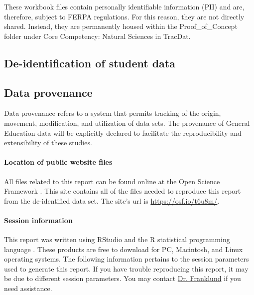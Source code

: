 \documentclass[fleqn,10pt]{SelfArx}\usepackage[]{graphicx}\usepackage[]{color}
\begin{document}
These workbook files contain personally identifiable information (PII) and are, therefore, subject to FERPA regulations. For this reason, they are not directly shared. Instead, they are permanently housed within the Proof\_of\_Concept folder under Core Competency: Natural Sciences in TracDat.

\subsection{De-identification of student data}

\subsection{Data provenance}
Data provenance refers to a system that permits tracking of the origin, movement, modification, and utilization of data sets\citep{Buneman2001}. The provenance of General Education data will be explicitly declared to facilitate the reproducibility and extensibility of these studies.

\paragraph{Location of public website files}
All files related to this report can be found online at the Open Science Framework \citep{Nosek2012}. This site contains all of the files needed to reproduce this report from the de-identified data set. The site's url is \href{https://osf.io/t6u8m/}{https://osf.io/t6u8m/}.

\paragraph{Session information}
This report was written using RStudio \citep{Rstudio} and the R statistical programming language \citep{R}. These products are free to download for PC, Macintosh, and Linux operating systems. The following information pertains to the session parameters used to generate this report. If you have trouble reproducing this report, it may be due to different session parameters. You may contact \href{mailto:CliftonFranklund@ferris.edu}{Dr. Franklund} if you need assistance.
\end{document}
